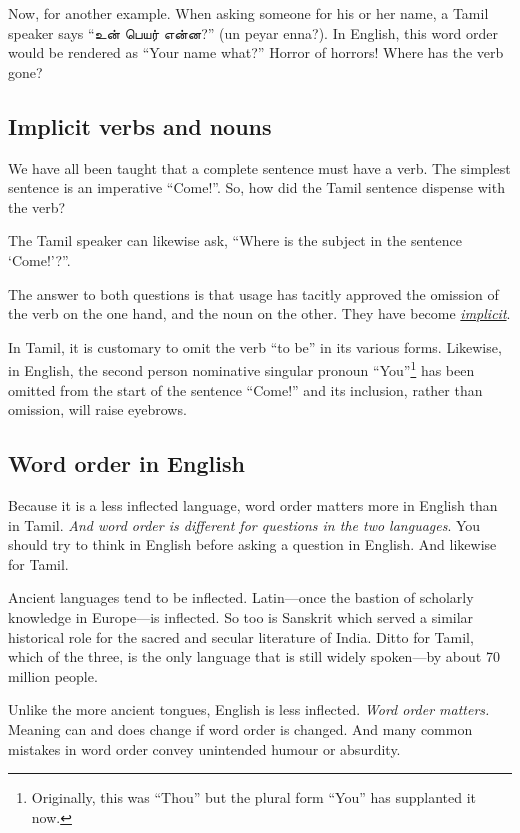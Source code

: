 \documentclass[
  a4paper,
]{article}
\begin{document}
Now, for another example. When asking someone for his or her name, a
Tamil speaker says ``உன் பெயர் என்ன?'' (un peyar enna?). In English,
this word order would be rendered as ``Your name what?'' Horror of
horrors! Where has the verb gone?

\hypertarget{implicit-verbs-and-nouns}{%
\subsection{Implicit verbs and nouns}\label{implicit-verbs-and-nouns}}

We have all been taught that a complete sentence must have a verb. The
simplest sentence is an imperative ``Come!''. So, how did the Tamil
sentence dispense with the verb?

The Tamil speaker can likewise ask, ``Where is the subject in the
sentence `Come!'?''.

The answer to both questions is that usage has tacitly approved the
omission of the verb on the one hand, and the noun on the other. They
have become
\href{https://www.thefreedictionary.com/implicit}{\emph{implicit}}.

In Tamil, it is customary to omit the verb ``to be'' in its various
forms. Likewise, in English, the second person nominative singular
pronoun ``You''\footnote{Originally, this was ``Thou'' but the plural
  form ``You'' has supplanted it now.} has been omitted from the start
of the sentence ``Come!'' and its inclusion, rather than omission, will
raise eyebrows.

\hypertarget{word-order-in-english}{%
\subsection{Word order in English}\label{word-order-in-english}}

Because it is a less inflected language, word order matters more in
English than in Tamil. \emph{And word order is different for questions
in the two languages}. You should try to think in English before asking
a question in English. And likewise for Tamil.

Ancient languages tend to be inflected. Latin---once the bastion of
scholarly knowledge in Europe---is inflected. So too is Sanskrit which
served a similar historical role for the sacred and secular literature
of India. Ditto for Tamil, which of the three, is the only language that
is still widely spoken---by about 70 million people.

Unlike the more ancient tongues, English is less inflected. \emph{Word
order matters.} Meaning can and does change if word order is changed.
And many common mistakes in word order convey unintended humour or
absurdity.
\end{document}
